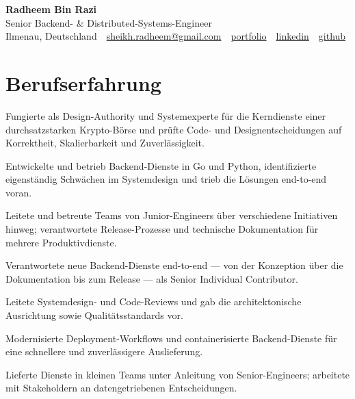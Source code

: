 \documentclass[11pt,a4paper]{resume}
\makeatletter
\newcommand{\Portfolio}{https://radheem.github.io/my-cv}
\newcommand{\PortfolioText}{portfolio}
\newcommand{\GitHub}{https://github.com/radheem}
\newcommand{\LinkedIn}{https://www.linkedin.com/in/radheem-razi}
\newcommand{\Email}{sheikh.radheem@gmail.com}
\makeatother
\begin{document}
\clearpage
{}

\begin{center}
  {\huge\bfseries Radheem Bin Razi}\\[3pt]
  {\large Senior Backend- \& Distributed-Systems-Engineer}\\[6pt]
  \small
  Ilmenau, Deutschland \,\textbar\,
  \href{mailto:\Email}{\Email} \,\textbar\,
  \href{\Portfolio}{\PortfolioText} \,\textbar\,
  \href{\LinkedIn}{linkedin} \,\textbar\,
  \href{\GitHub}{github}
\end{center}
\vspace{2pt}

\section{Berufserfahrung}

\bullets
  \item Fungierte als Design-Authority und Systemexperte für die Kerndienste einer durchsatzstarken Krypto-Börse und prüfte Code- und Designentscheidungen auf Korrektheit, Skalierbarkeit und Zuverlässigkeit.
  \item Entwickelte und betrieb Backend-Dienste in Go und Python, identifizierte eigenständig Schwächen im Systemdesign und trieb die Lösungen end-to-end voran.
  \item Leitete und betreute Teams von Junior-Engineers über verschiedene Initiativen hinweg; verantwortete Release-Prozesse und technische Dokumentation für mehrere Produktivdienste.
\bulletsend
\vspace{3pt}
\bullets
  \item Verantwortete neue Backend-Dienste end-to-end — von der Konzeption über die Dokumentation bis zum Release — als Senior Individual Contributor.
  \item Leitete Systemdesign- und Code-Reviews und gab die architektonische Ausrichtung sowie Qualitätsstandards vor.
  \item Modernisierte Deployment-Workflows und containerisierte Backend-Dienste für eine schnellere und zuverlässigere Auslieferung.
\bulletsend
\vspace{3pt}
\bullets
  \item Lieferte Dienste in kleinen Teams unter Anleitung von Senior-Engineers; arbeitete mit Stakeholdern an datengetriebenen Entscheidungen.
\bulletsend
\vspace{3pt}
\end{document}

